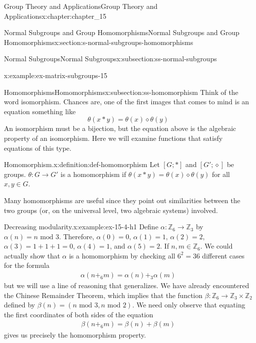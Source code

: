\documentclass[twoside,10pt,]{book}
\numberwithin{equation}{section}
\begin{document}
\begin{chapterptx}{Group Theory and Applications}{}{Group Theory and Applications}{}{}{x:chapter:chapter_15}
\begin{sectionptx}{Normal Subgroups and Group Homomorphisms}{}{Normal Subgroups and Group Homomorphisms}{}{}{x:section:s-normal-subgroups-homomorphisms}
\begin{subsectionptx}{Normal Subgroups}{}{Normal Subgroups}{}{}{x:subsection:ss-normal-subgroups}
\begin{example}{}{x:example:ex-matrix-subgroups-15}
\end{example}
\end{subsectionptx}
%
%
\typeout{************************************************}
\typeout{************************************************}
%
\begin{subsectionptx}{Homomorphisms}{}{Homomorphisms}{}{}{x:subsection:ss-homomorphism}
Think of the word isomorphism. Chances are, one of the first images that comes to mind is an equation something like%
\begin{equation*}
\theta(x * y) = \theta(x) \diamond  \theta(y)
\end{equation*}
An isomorphism must be a bijection, but the equation above is the algebraic property of an isomorphism. Here we will examine functions that satisfy equations of this type.%
\begin{definition}{Homomorphism.}{x:definition:def-homomorphism}%
%
Let \([G; *]\) and \([G';\diamond ]\) be groups. \(\theta:G \to G'\) is a homomorphism if \(\theta(x * y) = \theta(x) \diamond  \theta(y)\) for all \(x, y \in G\).%
\end{definition}
Many homomorphisms are useful since they point out similarities between the two groups (or, on the universal level, two algebraic systems) involved.%
\begin{example}{Decreasing modularity.}{x:example:ex-15-4-h1}%
Define \(\alpha:\mathbb{Z}_6\to \mathbb{Z}_3\) by \(\alpha(n)=n \textrm{ mod } 3\). Therefore, \(\alpha(0) = 0\), \(\alpha(1) = 1\), \(\alpha(2) = 2\), \(\alpha(3) =1 + 1 + 1=0\), \(\alpha(4) = 1\), and \(\alpha(5) = 2\). If \(n, m \in \mathbb{Z}_6\).  We could actually show that \(\alpha\) is a homomorphism by checking all \(6^2=36\) different cases for the formula%
\begin{gather}
\alpha(n +_6 m) = \alpha(n)+_3\alpha(m)\label{x:mrow:ex-15-4-h2}
\end{gather}
but we will use a line of reasoning that generalizes. We have already encountered the Chinese Remainder Theorem, which implies that the function \(\beta: \mathbb{Z}_6\to \mathbb{Z}_3 \times \mathbb{Z}_2\) defined by \(\beta(n)=(n\textrm{ mod } 3, n\textrm{ mod } 2)\). We need only observe that equating the first coordinates of both sides of the equation%
\begin{gather}
\beta(n +_6 m) = \beta(n)+\beta(m)\label{g:mrow:idm404598236576}
\end{gather}
gives us precisely the homomorphism property.%
\end{example}

\end{subsectionptx}
\end{sectionptx}
\end{chapterptx}
\end{document}
